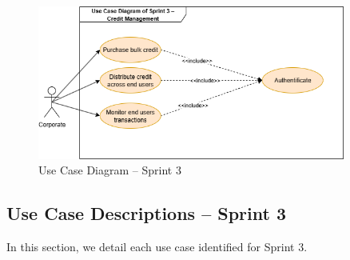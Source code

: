 \begin{figure}[htbp]
  \centering
  \includegraphics[width=0.9\textwidth]{images/usecase_sprint3.png}
  \caption{Use Case Diagram – Sprint 3}
  \label{fig:uc_sprint3}
\end{figure}

\subsection{Use Case Descriptions – Sprint 3}
In this section, we detail each use case identified for Sprint 3.

\vspace{4cm}

